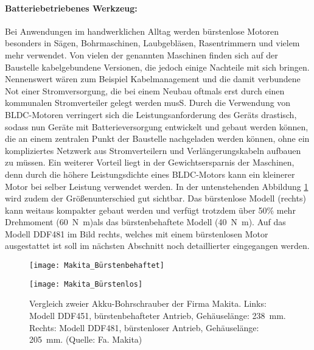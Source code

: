 \paragraph{Batteriebetriebenes Werkzeug:} Bei Anwendungen im handwerklichen Alltag werden bürstenlose Motoren besonders in Sägen, Bohrmaschinen, Laubgebläsen, Rasentrimmern und vielem mehr verwendet. Von vielen der genannten Maschinen finden sich auf der Baustelle kabelgebundene Versionen, die jedoch einige Nachteile mit sich bringen. Nennenswert wären zum Beispiel Kabelmanagement und die damit verbundene Not einer Stromversorgung, die bei einem Neubau oftmals erst durch einen kommunalen Stromverteiler gelegt werden musS.  Durch die Verwendung von BLDC-Motoren verringert sich die Leistungsanforderung des Geräts drastisch, sodass nun Geräte mit Batterieversorgung entwickelt und gebaut werden können, die an einem zentralen Punkt der Baustelle nachgeladen werden können, ohne ein kompliziertes Netzwerk aus Stromverteilern und Verlängerungskabeln aufbauen zu müssen. Ein weiterer Vorteil liegt in der Gewichtsersparnis der Maschinen, denn durch die höhere Leistungsdichte eines BLDC-Motors kann ein kleinerer Motor bei selber Leistung verwendet werden. In der untenstehenden Abbildung \ref{fig:Vergleich} wird zudem der Größenunterschied gut sichtbar. Das bürstenlose Modell (rechts) kann weitaus kompakter gebaut werden und verfügt trotzdem über 50\% mehr Drehmoment (\SI{60}{\newton\meter})als das bürstenbehaftete Modell (\SI{40}{\newton\meter}). Auf das Modell DDF481 im Bild rechts, welches mit einem bürstenlosen Motor ausgestattet ist soll im nächsten Abschnitt noch detaillierter eingegangen werden.

\begin{figure}[H]
  \centering
  \begin{minipage}{.49\textwidth}
    \centering
    \texttt{[image: Makita\_Bürstenbehaftet]}
  \end{minipage}\hfill%
  \begin{minipage}{.49\textwidth}
    \centering
    \texttt{[image: Makita\_Bürstenlos]}
  \end{minipage}
  \caption[Vergleich Akkubohrschrauber]{Vergleich zweier Akku-Bohrschrauber der Firma Makita. Links: Modell DDF451, bürstenbehafteter Antrieb, Gehäuselänge: \SI{238}{\milli\meter}. Rechts: Modell DDF481, bürstenloser Antrieb, Gehäuselänge: \SI{205}{\milli\meter}. (Quelle: Fa. Makita)}
  \label{fig:Vergleich}
\end{figure}

